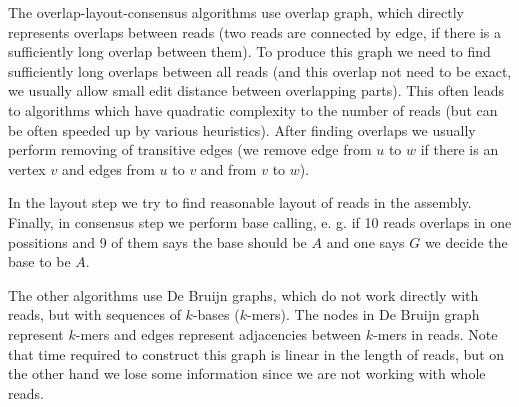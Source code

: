 The overlap-layout-consensus algorithms use overlap graph, which directly represents
overlaps between reads (two reads are connected by edge, if there is a sufficiently long overlap between them).
To produce this graph we need to find sufficiently long
overlaps between all reads (and this overlap not need to be exact, we usually allow small edit distance between overlapping parts).
This often leads to algorithms which have quadratic
complexity to the number of reads (but can be often speeded up by various heuristics).
After finding overlaps we usually perform removing of transitive edges (we remove edge
from $u$ to $w$ if there is an vertex $v$ and edges from $u$ to $v$ and from $v$ to $w$).

In the layout step we try to find reasonable layout of reads in the assembly.
Finally, in consensus step we perform base calling, e. g. if 10 reads overlaps in
one possitions and 9 of them says the base should be $A$ and one says $G$ we decide the base to
be $A$.

\medskip

The other algorithms use De Bruijn graphs, which do not work directly with reads, but
with sequences of $k$-bases ($k$-mers). The nodes in De Bruijn graph represent $k$-mers
and edges represent adjacencies between $k$-mers in reads. Note that time
required to construct this graph is linear in the length of reads, but on the other hand
we lose some information since we are not working with whole reads.
